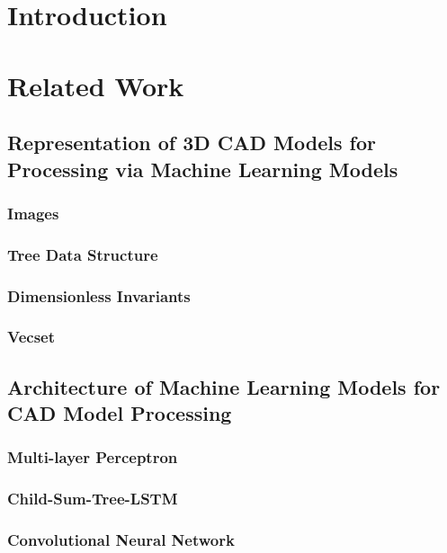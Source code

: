 \documentclass[5p,times,procedia]{elsarticle}
\begin{document}


\section{Introduction}\label{sec:Introduction}

\section{Related Work}\label{sec:Related-Work}
\subsection{Representation of 3D CAD Models for Processing via Machine Learning Models}\label{sec:CAD-Representations}
\subsubsection{Images}\label{sec:CAD-Representations-Images}
\subsubsection{Tree Data Structure}\label{sec:CAD-Representations-Tree}
\subsubsection{Dimensionless Invariants}\label{sec:CAD-Representations-Dimensionless-Invariants}
\subsubsection{Vecset}\label{sec:CAD-Representations-Vecset}
\subsection{Architecture of Machine Learning Models for CAD Model Processing}\label{sec:ML-Architectures}
\subsubsection{Multi-layer Perceptron}\label{sec:ML-Architectures-MLP}
\subsubsection{Child-Sum-Tree-LSTM}\label{sec:ML-Architectures-TreeLSTM}
\subsubsection{Convolutional Neural Network}\label{sec:ML-Architectures-CNN}
\end{document}
